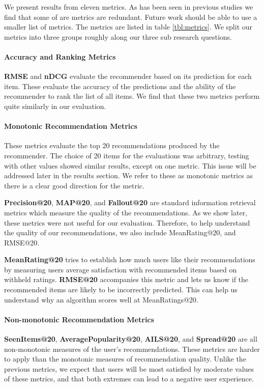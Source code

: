 \documentclass[letterpaper]{sig-alternate}
\begin{document}
  We present results from eleven metrics.
  As has been seen in previous studies \cite{herlockerEvaluating} we find that some of are metrics are redundant.
  Future work should be able to use a smaller list of metrics.
  The metrics are listed in table \ref{tbl:metrics}.
  We split our metrics into three groups roughly along our three sub research questions.
  
  \paragraph{Accuracy and Ranking Metrics}
  {\bf RMSE} and {\bf nDCG} evaluate the recommender based on its prediction for each item.
  These evaluate the accuracy of the predictions and the ability of the recommender to rank the list of all items.
  We find that these two metrics perform quite similarly in our evaluation.

  \addtocounter{footnote}{1}

  \paragraph{Monotonic Recommendation Metrics}
  These metrics evaluate the top 20 recommendations produced by the recommender.
  The choice of 20 items for the evaluations was arbitrary, testing with other values showed similar results, except on one metric.
  This issue will be addressed later in the results section.
  We refer to these as monotonic metrics as there is a clear good direction for the metric.

  {\bf Precision@20}, {\bf MAP@20}, and {\bf Fallout@20} are standard information retrieval metrics which measure the quality of the recommendations.
  As we show later, these metrics were not useful for our evaluation.
  Therefore, to help understand the quality of our recommendations, we also include MeanRating@20, and RMSE@20.

  {\bf MeanRating@20} tries to establish how much users like their recommendations by measuring users average satisfaction with recommended items based on withheld ratings.
  {\bf RMSE@20} accompanies this metric and lets us know if the recommended items are likely to be incorrectly predicted. 
  This can help us understand why an algorithm scores well at MeanRatings@20.  
  
  \paragraph{Non-monotonic Recommendation Metrics}
  {\bf SeenItems@20}, {\bf AveragePopularity@20}, {\bf AILS@20}, and {\bf Spread@20} are all non-monotonic measures of the user's recommendations.
  These metrics are harder to apply than the monotonic measures of recommendation quality.
  Unlike the previous metrics, we expect that users will be most satisfied by moderate values of these metrics, and that both extremes can lead to a negative user experience.
\end{document}
